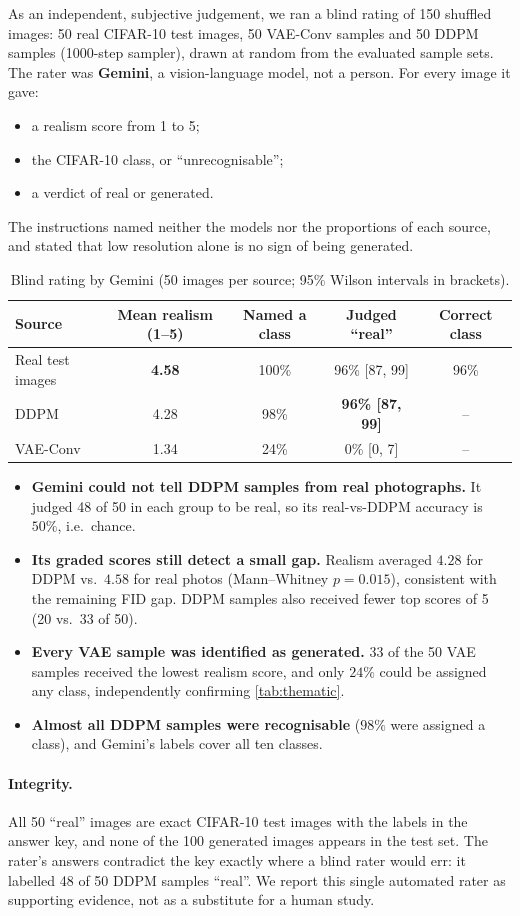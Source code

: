 As an independent, subjective judgement, we ran a blind rating of 150 shuffled images: 50 real CIFAR-10 test
images, 50 VAE-Conv samples and 50 DDPM samples (1000-step sampler), drawn at random from the evaluated sample
sets. The rater was \textbf{Gemini}, a vision-language model, not a person. For every image it gave:
\begin{itemize}
  \item a realism score from 1 to 5;
  \item the CIFAR-10 class, or ``unrecognisable'';
  \item a verdict of real or generated.
\end{itemize}
The instructions named neither the models nor the proportions of each source, and stated that low resolution
alone is no sign of being generated.

\begin{table}[H]
\centering\small
\caption{Blind rating by Gemini (50 images per source; 95\% Wilson intervals in brackets).}
\label{tab:blind}
\begin{tabular}{@{}lcccc@{}}
\toprule
Source & Mean realism (1--5) & Named a class & Judged ``real'' & Correct class\\
\midrule
Real test images & \textbf{4.58} & 100\% & 96\% [87, 99] & 96\%\\
DDPM & 4.28 & 98\% & \textbf{96\% [87, 99]} & --\\
VAE-Conv & 1.34 & 24\% & 0\% [0, 7] & --\\
\bottomrule
\end{tabular}
\end{table}

\begin{itemize}
  \item \textbf{Gemini could not tell DDPM samples from real photographs.} It judged 48 of 50 in each group to be
        real, so its real-vs-DDPM accuracy is $50\%$, i.e.\ chance.
  \item \textbf{Its graded scores still detect a small gap.} Realism averaged $4.28$ for DDPM vs.\ $4.58$ for real
        photos (Mann--Whitney $p=0.015$), consistent with the remaining FID gap.
        DDPM samples also received fewer top scores of 5 (20 vs.\ 33 of 50).
  \item \textbf{Every VAE sample was identified as generated.} 33 of the 50 VAE samples received the lowest
        realism score, and only $24\%$ could be assigned any class, independently confirming \cref{tab:thematic}.
  \item \textbf{Almost all DDPM samples were recognisable} ($98\%$ were assigned a class), and Gemini's labels cover
        all ten classes.
\end{itemize}

\paragraph{Integrity.} All 50 ``real'' images are exact CIFAR-10 test images with the labels in the answer key, and
none of the 100 generated images appears in the test set. The rater's answers contradict the key exactly where a
blind rater would err: it labelled 48 of 50 DDPM samples ``real''. We report this single automated rater as
supporting evidence, not as a substitute for a human study.
